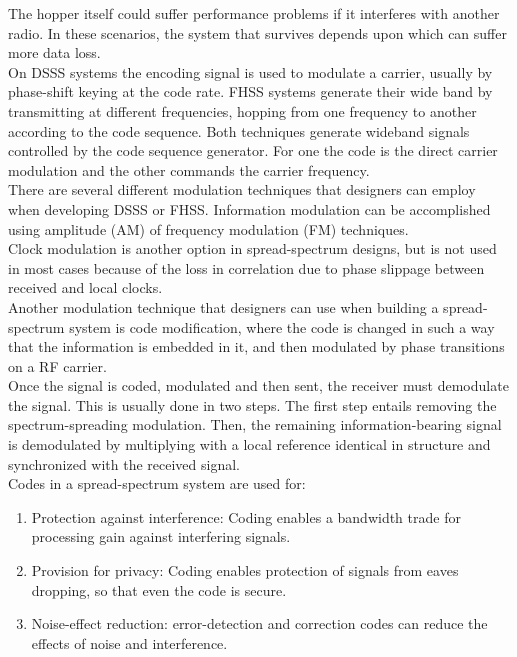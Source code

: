 \documentclass[12pt, a4paper,twoside]{tesi_upf}
\begin{document}
The hopper itself could suffer performance problems if it interferes with another radio. In these scenarios, the system that survives depends upon which can suffer more data loss.
\\[12pt]

On DSSS systems the encoding signal is used to modulate a carrier, usually by phase-shift keying at the code rate. FHSS systems generate their wide band by transmitting at different frequencies, hopping from one frequency to another according to the code sequence. Both techniques generate wideband signals controlled by the code sequence generator. For one the code is the direct carrier modulation and the other commands the carrier frequency.
\\[12pt]

There are several different modulation techniques that designers can employ when developing DSSS or FHSS. Information modulation can be accomplished using amplitude (AM) of frequency modulation (FM) techniques.
\\[12pt]

Clock modulation is another option in spread-spectrum designs, but is not used in most cases because of the loss in correlation due to phase slippage between received and local clocks.
\\[12pt]

Another modulation technique that designers can use when building a spread-spectrum system is code modification, where the code is changed in such a way that the information is embedded in it, and then modulated by phase transitions on a RF carrier.
\\[12pt]

Once the signal is coded, modulated and then sent, the receiver must demodulate the signal. This is usually done in two steps. The first step entails removing the spectrum-spreading modulation. Then, the remaining information-bearing signal is demodulated by multiplying with a local reference identical in structure and synchronized with the received signal.
\\[12pt]

Codes in a spread-spectrum system are used for:

\begin{enumerate}
	\item Protection against interference: Coding enables a bandwidth trade for processing gain against interfering signals.
	\item Provision for privacy: Coding enables protection of signals from eaves dropping, so that even the code is secure.
	\item Noise-effect reduction: error-detection and correction codes can reduce the effects of noise and interference.
\end{enumerate}
\end{document}
